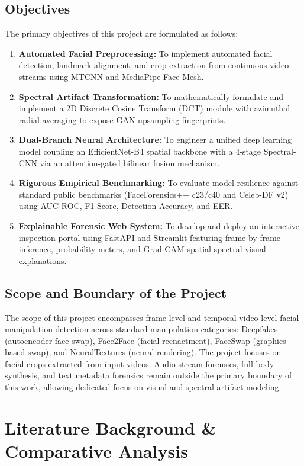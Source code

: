 \documentclass[12pt,a4paper]{report}
\begin{document}
\section{Objectives}
The primary objectives of this project are formulated as follows:
\begin{enumerate}
    \item \textbf{Automated Facial Preprocessing:} To implement automated facial detection, landmark alignment, and crop extraction from continuous video streams using MTCNN and MediaPipe Face Mesh.
    \item \textbf{Spectral Artifact Transformation:} To mathematically formulate and implement a 2D Discrete Cosine Transform (DCT) module with azimuthal radial averaging to expose GAN upsampling fingerprints.
    \item \textbf{Dual-Branch Neural Architecture:} To engineer a unified deep learning model coupling an EfficientNet-B4 spatial backbone with a 4-stage Spectral-CNN via an attention-gated bilinear fusion mechanism.
    \item \textbf{Rigorous Empirical Benchmarking:} To evaluate model resilience against standard public benchmarks (FaceForensics++ c23/c40 and Celeb-DF v2) using AUC-ROC, F1-Score, Detection Accuracy, and EER.
    \item \textbf{Explainable Forensic Web System:} To develop and deploy an interactive inspection portal using FastAPI and Streamlit featuring frame-by-frame inference, probability meters, and Grad-CAM spatial-spectral visual explanations.
\end{enumerate}

\section{Scope and Boundary of the Project}
The scope of this project encompasses frame-level and temporal video-level facial manipulation detection across standard manipulation categories: Deepfakes (autoencoder face swap), Face2Face (facial reenactment), FaceSwap (graphics-based swap), and NeuralTextures (neural rendering). The project focuses on facial crops extracted from input videos. Audio stream forensics, full-body synthesis, and text metadata forensics remain outside the primary boundary of this work, allowing dedicated focus on visual and spectral artifact modeling.

\newpage

\chapter{Literature Background \& Comparative Analysis}
\end{document}
